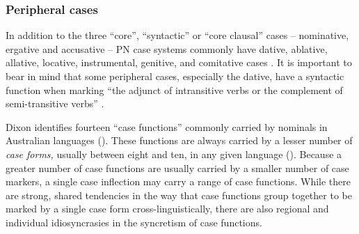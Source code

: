 \begin{table}\footnotesize
{}
    \caption{The split in marking the syntactic cases in the languages treated in the corpus.}
    \label{tab:chap1:split}
\end{table}

\subsubsection{Peripheral cases}
\label{sec:key:1.2.2.2}

In addition to the three “core”, “syntactic” or “core clausal” \citep[132]{dixon_australian_2002} cases – nominative, ergative and accusative – PN case systems commonly have dative, ablative, allative, locative, instrumental, genitive, and comitative cases \citep[158]{blake_case_2001}. It is important to bear in mind that some peripheral cases, especially the dative, have a syntactic function when marking “the adjunct of intransitive verbs or the complement of semi-transitive verbs” \citet[330--331]{blake_australian_1979}.

Dixon identifies fourteen ``case functions'' commonly carried by nominals in Australian languages (\citeyear[132--143]{dixon_australian_2002}). These functions are always carried by a lesser number of \textit{case forms,} usually between eight and ten, in any given language (\citeyear[152]{dixon_australian_2002}). Because a greater number of case functions are usually carried by a smaller number of case markers, a single case inflection may carry a range of case functions. While there are strong, shared tendencies in the way that case functions group together to be marked by a single case form cross-linguistically, there are also regional and individual idiosyncrasies in the syncretism of case functions. 

